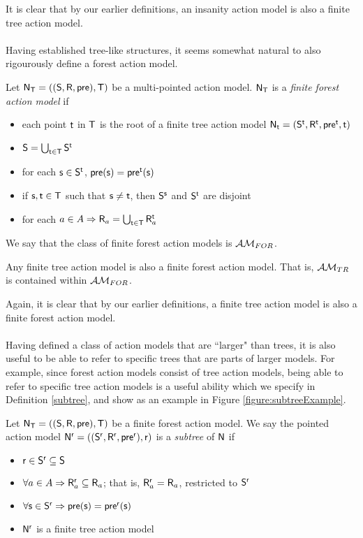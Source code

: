 It is clear that by our earlier definitions, an insanity action model is also a
finite tree action model.\\
\\
Having established tree-like structures, it seems somewhat natural to also rigourously define a
forest action model.

\begin{defn} \label{forest}
Let $\evM_\evT = ((\evS, \evR, \evpr), \evT)$ be a multi-pointed action model.
$\evM_\evT$ is a {\em finite forest action model} if
\begin{itemize}
	\item each point $\evt$ in $\evT$ is the root of a finite tree action model $\evM_\evt =
	(\evS^\evt, \evR^\evt,
	\evpr^\evt, \evt)$
  \item $\evS = \bigcup_{\evt \in \evT} \evS^\evt$
	\item for each $\evs \in \evS^\evt$, $\evpr(\evs) = \evpr^\evt(\evs)$
	\item if $\evs, \evt \in \evT$ such that $\evs \neq \evt$, then $\evS^\evs$ and $\evS^\evt$ are disjoint
  \item for each $a \in A \Rightarrow \evR_a = \bigcup_{\evt \in \evT} \evR_a^\evt$
\end{itemize}
\end{defn}

We say that the class of finite forest action models is $\forestClass$.

\begin{lemma} \label{treeIsForest}
	Any finite tree action model is also a finite forest action model.
	That is, $\treeClass$ is contained within $\forestClass$.
\end{lemma}

Again, it is clear that by our earlier definitions, a finite tree action model
is also a finite forest action
model.\\
\\
Having defined a class of action models that are ``larger" than trees, it is also useful to be able
to refer to specific trees that are parts of larger models.
For example, since forest action models consist of tree action models, being able to refer to specific
tree action models is a useful ability which we specify in Definition \ref{subtree}, and show as an
example in Figure \ref{figure:subtreeExample}.

\begin{defn} \label{subtree}
Let $\evM_\evT = ((\evS, \evR, \evpr), \evT)$ be a finite forest action model.
We say the pointed action model $\evM^{\evr} = ((\evS^{\evr}, \evR^{\evr}, \evpr^{\evr}), \evr)$
is a {\em subtree} of $\evM$ if
\begin{itemize}
	\item $\evr \in \evS^\evr \subseteq \evS$
	\item $\forall a \in A \Rightarrow \evR_a^\evr \subseteq \evR_a$; that is, $\evR^\evr_a = \evR_a$,
		restricted to $\evS^\evr$
	\item $\forall \evs \in \evS^\evr \Rightarrow \evpr(\evs) = \evpr^\evr(\evs) $
	\item $\evM^\evr$ is a finite tree action model
\end{itemize}
\end{defn}

